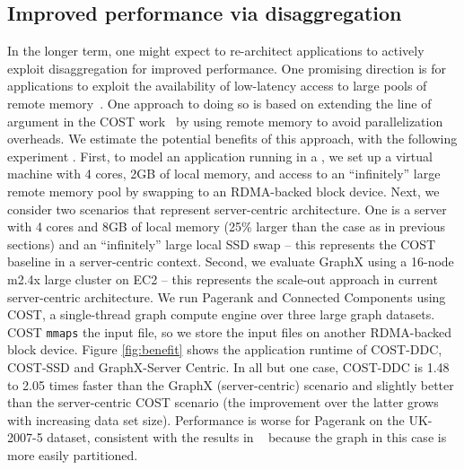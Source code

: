 \subsection{Improved performance via disaggregation}
In the longer term, one might expect to re-architect applications to actively exploit disaggregation for improved performance.
One promising direction is for applications to exploit the availability of low-latency access to large pools of remote memory~\cite{ddcHwDesign1}. 
One approach to doing so is based on extending the line of argument in the COST work~\cite{cost} by using remote memory to avoid parallelization overheads.
We estimate the potential benefits of this approach, with the following experiment .
First, to model an application running in a \dis, we set up a virtual machine with 4 cores,  2GB of local memory, and access to an ``infinitely'' large remote memory pool by swapping to an RDMA-backed block device. 
Next, we consider two scenarios that represent server-centric architecture.
One is a server with 4 cores and 8GB of local memory (25\% larger than the \dis case as in previous sections) and an ``infinitely'' large local SSD swap -- this represents the COST baseline in a server-centric context. 
Second, we evaluate GraphX using a 16-node m2.4x large cluster on EC2 -- this represents the scale-out approach in current server-centric architecture.
We run Pagerank and Connected Components using COST, a single-thread graph compute engine over three large graph datasets. COST \texttt{mmaps} the input file, so we store the input files on another RDMA-backed block device.
Figure \ref{fig:benefit} shows the application runtime of COST-DDC, COST-SSD and GraphX-Server Centric.
In all but one case, COST-DDC is 1.48 to 2.05 times faster than the GraphX (server-centric) scenario and slightly better than the server-centric COST scenario (the improvement over the latter grows with increasing data set size). Performance is worse for Pagerank on the UK-2007-5 dataset, consistent with the results in ~\cite{cost} because the graph in this case is more easily partitioned. 



